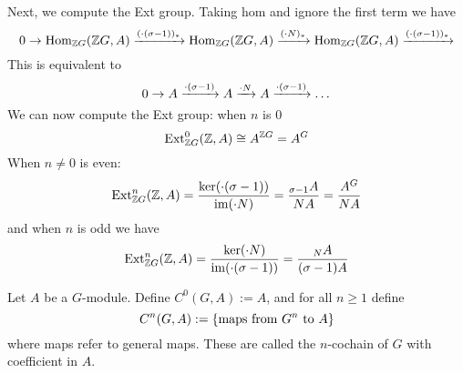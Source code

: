 \begin{ex}
    Next, we compute the Ext group. Taking hom and ignore the first term we have
    \[0 \to \operatorname{Hom}_{{\mathbb Z} G} ({\mathbb Z} G, A) \xrightarrow{(\cdot (\sigma-1))_*}  \operatorname{Hom}_{{\mathbb Z} G} ({\mathbb Z} G, A) \xrightarrow{(\cdot N)_*}  \operatorname{Hom}_{{\mathbb Z} G} ({\mathbb Z} G, A) \xrightarrow{(\cdot (\sigma-1))_*} \]
    This is equivalent to
    \[0 \to A \xrightarrow{\cdot (\sigma-1)} A \xrightarrow{\cdot N} A \xrightarrow{\cdot (\sigma-1)} \dots\]
    We can now compute the Ext group: when $n$ is $0$
    \[\operatorname{Ext}_{{\mathbb Z} G}^0 ({\mathbb Z}, A) \cong A^{{\mathbb Z} G} = A^G\]
    When $n\neq 0$ is even:
    \[\operatorname{Ext}_{{\mathbb Z} G}^n ({\mathbb Z}, A) = \frac{\ker (\cdot (\sigma -1))}{\operatorname{im} (\cdot N)} = \frac{_{\sigma-1} A}{NA} = \frac{A^G}{NA}\]
    and when $n$ is odd we have 
    \[\operatorname{Ext}_{{\mathbb Z} G}^n ({\mathbb Z}, A) = \frac{\ker (\cdot N)}{\operatorname{im} (\cdot (\sigma-1))} = \frac{_N A}{(\sigma-1)A}\]
\end{ex}

\medskip

\begin{defn} 
    Let $A$ be a $G$-module. Define $C^0(G,A):= A$, and for all $n\geq 1$ define
    \[C^n(G,A) := \left\{\text{maps from $G^n$ to $A$}\right\}\]
    where maps refer to general maps. These are called the $n$-cochain of $G$ with coefficient in $A$.
\end{defn}

\medskip

